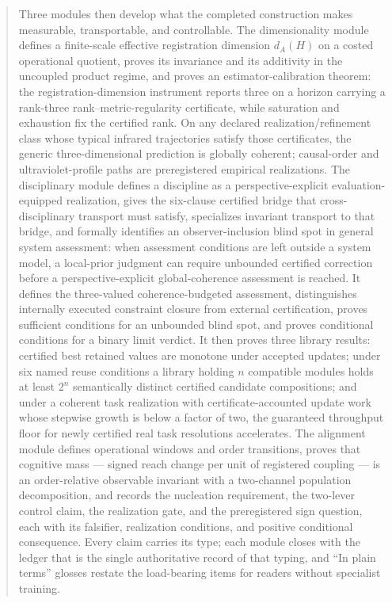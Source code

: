 \documentclass[11pt]{article}
\theoremstyle{definition}
\begin{document}
\begin{abstract}
Three modules then develop what the completed construction makes measurable, transportable, and controllable. The dimensionality module defines a finite-scale effective registration dimension $d_A(H)$ on a costed operational quotient, proves its invariance and its additivity in the uncoupled product regime, and proves an estimator-calibration theorem: the registration-dimension instrument reports three on a horizon carrying a rank-three rank--metric-regularity certificate, while saturation and exhaustion fix the certified rank. On any declared realization/refinement class whose typical infrared trajectories satisfy those certificates, the generic three-dimensional prediction is globally coherent; causal-order and ultraviolet-profile paths are preregistered empirical realizations. The disciplinary module defines a discipline as a perspective-explicit evaluation-equipped realization, gives the six-clause certified bridge that cross-disciplinary transport must satisfy, specializes invariant transport to that bridge, and formally identifies an observer-inclusion blind spot in general system assessment: when assessment conditions are left outside a system model, a local-prior judgment can require unbounded certified correction before a perspective-explicit global-coherence assessment is reached. It defines the three-valued coherence-budgeted assessment, distinguishes internally executed constraint closure from external certification, proves sufficient conditions for an unbounded blind spot, and proves conditional conditions for a binary limit verdict. It then proves three library results: certified best retained values are monotone under accepted updates; under six named reuse conditions a library holding $n$ compatible modules holds at least $2^n$ semantically distinct certified candidate compositions; and under a coherent task realization with certificate-accounted update work whose stepwise growth is below a factor of two, the guaranteed throughput floor for newly certified real task resolutions accelerates. The alignment module defines operational windows and order transitions, proves that cognitive mass --- signed reach change per unit of registered coupling --- is an order-relative observable invariant with a two-channel population decomposition, and records the nucleation requirement, the two-lever control claim, the realization gate, and the preregistered sign question, each with its falsifier, realization conditions, and positive conditional consequence. Every claim carries its type; each module closes with the ledger that is the single authoritative record of that typing, and ``In plain terms'' glosses restate the load-bearing items for readers without specialist training.
\end{abstract}
\end{document}
